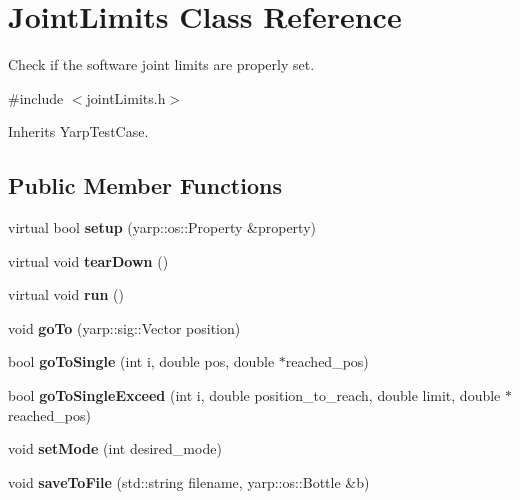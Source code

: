 \section{Joint\-Limits Class Reference}
\label{classJointLimits}


Check if the software joint limits are properly set.  




{\ttfamily \#include $<$joint\-Limits.\-h$>$}



Inherits Yarp\-Test\-Case.

\subsection*{Public Member Functions}
\begin{DoxyCompactItemize}
\item 
virtual bool {\bfseries setup} (yarp\-::os\-::\-Property \&property)\label{classJointLimits_aab2cba8458562fa010452d40812d2088}

\item 
virtual void {\bfseries tear\-Down} ()\label{classJointLimits_af90bca494fc174654dbd23050438f677}

\item 
virtual void {\bfseries run} ()\label{classJointLimits_a7d638220c08c9c3c500ffb6b4ecfcaa9}

\item 
void {\bfseries go\-To} (yarp\-::sig\-::\-Vector position)\label{classJointLimits_af409fb877cde1701963fa0d5bcbb12be}

\item 
bool {\bfseries go\-To\-Single} (int i, double pos, double $\ast$reached\-\_\-pos)\label{classJointLimits_a5a4a3ea41f4fb7c0e9d93fbc75a6c71c}

\item 
bool {\bfseries go\-To\-Single\-Exceed} (int i, double position\-\_\-to\-\_\-reach, double limit, double $\ast$reached\-\_\-pos)\label{classJointLimits_a5a16400201125c505224fe7280d31443}

\item 
void {\bfseries set\-Mode} (int desired\-\_\-mode)\label{classJointLimits_ae4d5b348e7689e4c1382252bcbb0ae0a}

\item 
void {\bfseries save\-To\-File} (std\-::string filename, yarp\-::os\-::\-Bottle \&b)\label{classJointLimits_a0790f6c7d9d1886aaa1bb4848cf790ef}

\end{DoxyCompactItemize}


